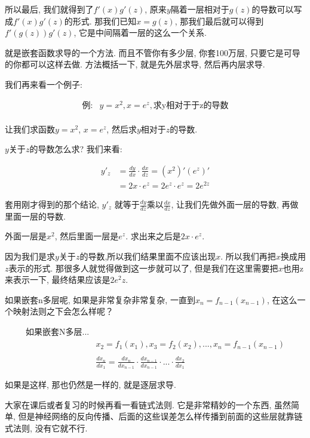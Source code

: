 所以最后, 我们就得到了$f'(x)g'(z)$, 原来$y$隔着一层相对于$g(z)$的导数可以写成$f'(x)g'(z)$的形式. 那我们已知$x=g(z)$,  那我们最后就可以得到$f'(g(z))g'(z)$, 它是中间隔着一层的这么一个关系. 

就是嵌套函数求导的一个方法. 而且不管你有多少层, 你套100万层, 只要它是可导的你都可以这样去做. 方法概括一下, 就是先外层求导, 然后再内层求导. 

我们再来看一个例子:

\begin{align*}
  \mbox{例}:& y = x^2, x=e^z, \mbox{求y相对于于z的导数} \\
\end{align*}

让我们求函数$y=x^2$, $x=e^z$, 然后求$y$相对于$z$的导数. 

$y$关于$z$的导数怎么求? 我们来看:

\begin{align*}
  y'_z & = \frac{dy}{dx} \cdot \frac{dx}{dz} = (x^2)'(e^z)' \\
  & = 2x \cdot e^z = 2e^z \cdot e^z = 2e^{2z}
\end{align*}


套用刚才得到的那个结论, $y'_z$ 就等于$\frac{dy}{dz}$乘以$\frac{dx}{dz}$, 让我们先做外面一层的导数, 再做里面一层的导数. 

外面一层是$x^2$, 然后里面一层是$e^z$. 求出来之后是$2x\cdot e^z$. 

因为我们是求$y$关于$z$的导数,所以我们结果里面不应该出现$x$. 所以我们再把$x$换成用$z$表示的形式. 那很多人就觉得做到这一步就可以了, 但是我们在这里需要把$x$也用z来表示一下, 最终结果应该是$2e^2z$. 

如果嵌套n多层呢, 如果是非常复杂非常复杂, 一直到$x_n = f_{n-1}(x_{n-1})$, 在这么一个映射法则之下会怎么样呢？ 

\begin{align*}
  \mbox{如果嵌套N多层...} & \\
  & x_2 = f_1(x_1), x_3 = f_2(x_2), ..., x_n = f_{n-1}(x_{n-1}) \\ \\
  & \frac{dx_n}{dx_1} = \frac{dx_n}{dx_{n-1}} \cdot \frac{dx_{n-1}}{dx_{n-1}} \cdot ... \cdot \frac{dx_2}{dx_1}
\end{align*}

如果是这样, 那也仍然是一样的, 就是逐层求导. 

大家在课后或者复习的时候再看一看链式法则. 它是非常精妙的一个东西, 虽然简单, 但是神经网络的反向传播、后面的这些误差怎么样传播到前面的这些层就靠链式法则, 没有它就不行. 

